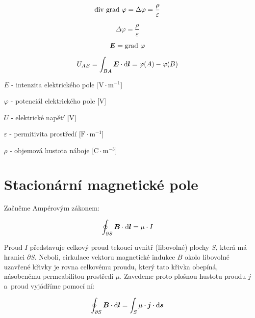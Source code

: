 \begin{equation}
\mathrm{div} \ \mathrm{grad} \ \varphi = \Delta \varphi = \frac{\rho}{\varepsilon}
\end{equation}

\begin{fact}
\begin{equation}
\Delta \varphi = \frac{\rho}{\varepsilon}
\end{equation}

\begin{equation}
\boldsymbol{E} = \mathrm{grad} \ \varphi
\end{equation}

\begin{equation}
U_{AB} = \int_{BA} \boldsymbol{E} \cdot \mathrm{d}\boldsymbol{l} = \varphi(A) - \varphi(B) 
\end{equation}

\(E\) - intenzita elektrického pole [\(\mathrm{V} \cdot \mathrm{m}^{-1}\)]

\(\varphi\) - potenciál elektrického pole [\(\mathrm{V}\)]

\(U\) - elektrické napětí [\(\mathrm{V}\)]

\(\varepsilon\) - permitivita prostředí [\(\mathrm{F} \cdot \mathrm{m}^{-1}\)]

\(\rho\) - objemová hustota náboje [\(\mathrm{C} \cdot \mathrm{m}^{-3}\)] 
\end{fact}

\section{Stacionární magnetické pole}

Začněme Ampérovým zákonem:

\begin{equation}
\oint_{\partial S} \boldsymbol{B} \cdot \mathrm{d}\boldsymbol{l} = \mu \cdot I
\end{equation}

Proud \(I\) představuje celkový proud tekoucí uvnitř (libovolné) plochy \(S\), která má hranici \(\partial S\). Neboli, cirkulace vektoru magnetické indukce \(B\) okolo libovolné uzavřené křivky je rovna celkovému proudu, který tato křivka obepíná, násobenému permeabilitou prostředí \(\mu\). Zavedeme proto plošnou hustotu proudu \(j\) a~proud vyjádříme pomocí ní:

\begin{equation}
\oint_{\partial S} \boldsymbol{B} \cdot \mathrm{d}\boldsymbol{l} = \int_S \mu \cdot \boldsymbol{j} \cdot \mathrm{d}\boldsymbol{s}
\end{equation}

